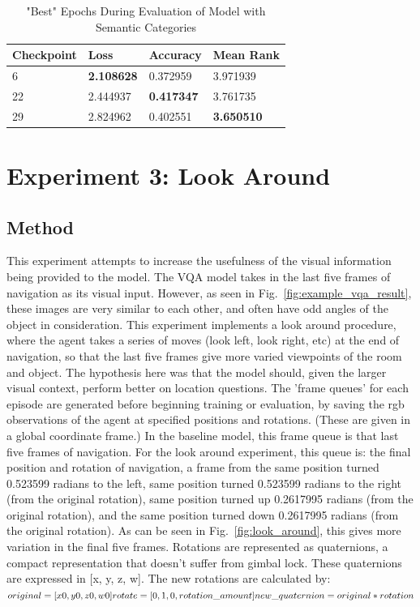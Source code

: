\begin{table}[H]
\centering
\caption{"Best" Epochs During Evaluation of Model with Semantic Categories}
\begin{tabular}{l | l | l | l}
Checkpoint & Loss & Accuracy & Mean Rank \\
\hline
6 & \textbf{2.108628} & 0.372959 & 3.971939 \\
22 & 2.444937 & \textbf{0.417347} & 3.761735 \\
29 & 2.824962 & 0.402551 & \textbf{3.650510} 
\end{tabular}
\label{tab:best_category}
\end{table}

\section{Experiment 3: Look Around}
\label{sec:exp_3}
\subsection{Method}
This experiment attempts to increase the usefulness of the visual information being provided to the model. The VQA model takes in the last five frames of navigation as its visual input. However, as seen in Fig.~\ref{fig:example_vqa_result}, these images are very similar to each other, and often have odd angles of the object in consideration. This experiment implements a look around procedure, where the agent takes a series of moves (look left, look right, etc) at the end of navigation, so that the last five frames give more varied viewpoints of the room and object. The hypothesis here was that the model should, given the larger visual context, perform better on location questions. \newline
The 'frame queues' for each episode are generated before beginning training or evaluation, by saving the rgb observations of the agent at specified positions and rotations. (These are given in a global coordinate frame.) In the baseline model, this frame queue is that last five frames of navigation. For the look around experiment, this queue is: the final position and rotation of navigation, a frame from the same position turned 0.523599 radians to the left, same position turned 0.523599 radians to the right (from the original rotation), same position turned up 0.2617995 radians (from the original rotation), and the same position turned down 0.2617995 radians (from the original rotation). As can be seen in Fig.~\ref{fig:look_around}, this gives more variation in the final five frames. \newline
Rotations are represented as quaternions, a compact representation that doesn't suffer from gimbal lock. These quaternions are expressed in [x, y, z, w]. The new rotations are calculated by: \\ \begin{math}
original = [x0, y0, z0, w0] \\
rotate = [0, 1, 0, rotation\_amount] \\
new\_quaternion = original * rotation
\end{math}

